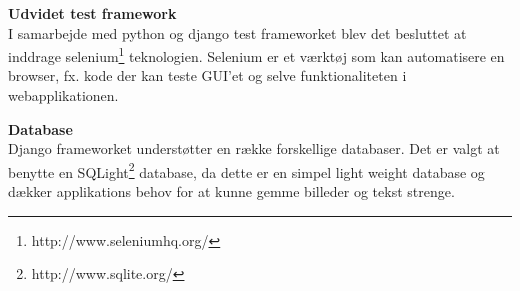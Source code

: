 \textbf{Udvidet test framework} \\
I samarbejde med python og django test frameworket blev det besluttet at inddrage selenium\footnote{http://www.seleniumhq.org/} teknologien. Selenium er et værktøj som kan automatisere en browser, fx. kode der kan teste GUI'et og selve funktionaliteten i webapplikationen. 

\textbf{Database}\\
Django frameworket understøtter en række forskellige databaser. Det er valgt at benytte en SQLight\footnote{http://www.sqlite.org/} database, da dette er en simpel light weight database og dækker applikations behov for at kunne gemme billeder og tekst strenge. 